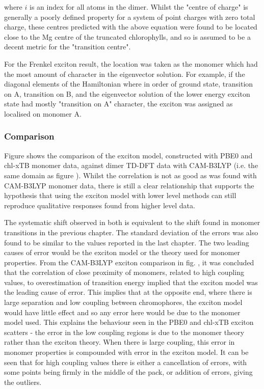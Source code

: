 where $i$ is an index for all atoms in the dimer. Whilst the "centre of charge"
is generally a poorly defined property for a system of point charges with zero total
charge, these centres predicted with the above equation were found to be located close
to the Mg centre of the truncated chlorophylls, and so is assumed to be a decent
metric for the "transition centre".

For the Frenkel exciton result, the location was taken as the monomer which had 
the most amount of character in the eigenvector solution. For example, if the diagonal
elements of the Hamiltonian where in order of ground state, transition on A, transition
on B, and the eigenvector solution of the lower energy exciton state had mostly
"transition on A" character, the exciton was assigned as localised on monomer A.

\subsubsection{Comparison}
\label{subsec:state_assign}

Figure shows the comparison of the exciton model, constructed with PBE0 and chl-xTB
monomer data, against dimer TD-DFT data with CAM-B3LYP (i.e. the same domain as 
figure ). Whilst the correlation is not as good as was found with CAM-B3LYP monomer
data, there is still a clear relationship that supports the hypothesis that using
the exciton model with lower level methods can still reproduce qualitative responses
found from higher level data.

The systematic shift observed in both is equivalent to the shift found in monomer
transitions in the previous chapter. The standard deviation of the errors was also
found to be similar to the values reported in the last chapter. 
The two leading causes of error would be the exciton model or the theory used for
monomer properties. From the CAM-B3LYP exciton comparison in fig. , it was concluded
that the correlation of close proximity of monomers, related to high coupling values,
to overestimation of transition energy implied that the exciton model was the leading
cause of error. This implies that at the opposite end, where there is large separation
and low coupling between chromophores, the exciton model would have little effect
and so any error here would be due to the monomer model used. This explains the 
behaviour seen in the PBE0 and chl-xTB exciton scatters - the error in the low coupling
regions is due to the monomer theory rather than the exciton theory. When there is 
large coupling, this error in monomer properties is compounded with error in the
exciton model. It can be seen that for high coupling values there is either a cancellation
of errors, with some points being firmly in the middle of the pack, or addition 
of errors, giving the outliers.

